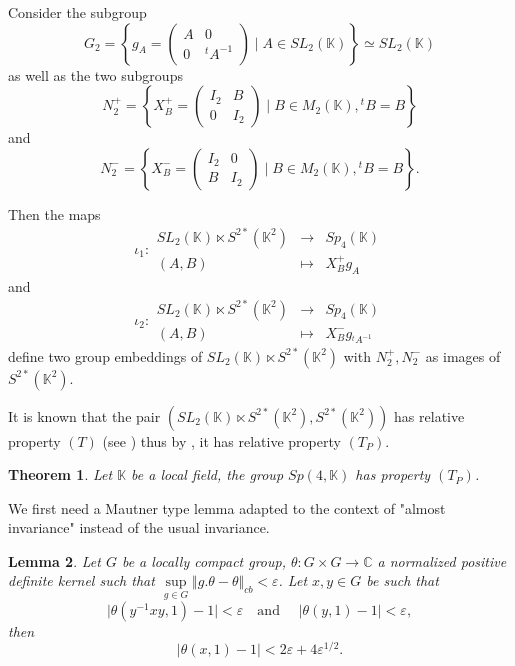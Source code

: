 \documentclass{article}
\newtheorem{theorem}{Theorem}[section]
\newtheorem{lem}[theorem]{Lemma}
\theoremstyle{definition}
\theoremstyle{remark}
\numberwithin{equation}{section}
\newcommand{\C}{\mathbb{C}}
\newcommand{\K}{\mathbb{K}}
\newcommand{\fonction}[5]{#1: \begin{array}{ccc}
#2 & \rightarrow & #3 \\
 #4 & \longmapsto & #5 \end{array}}
\begin{document}
Consider the subgroup $$G_2=\left\lbrace g_A=\begin{pmatrix}A & 0\\0& {}^tA^{-1} \end{pmatrix} \mid A\in SL_2(\K)\right\rbrace\simeq SL_2(\K)$$as well as the two subgroups$$N_2^{+}=\left\lbrace X_B^+=\begin{pmatrix}I_2 & B\\0&I_2\end{pmatrix}\mid B\in M_2(\K), {}^tB=B 
\right\rbrace$$and$$N_2^-=\left\lbrace X_B^-=\begin{pmatrix}I_2 & 0\\B&I_2 \end{pmatrix}\mid B\in M_2(\K), {}^tB=B \right\rbrace.$$

Then the maps $$\fonction{\iota_1}{SL_2(\K)\ltimes S^{2*}(\K^2)}{Sp_4(\K)}{(A,B)}{X_B^+g_A}$$and $$\fonction{\iota_2}{SL_2(\K)\ltimes S^{2*}(\K^2)}{Sp_4(\K)}{(A,B)}{X_B^-g_{{}^tA^{-1}}}$$define two group embeddings of $SL_2(\K)\ltimes S^{2*}(\K^2)$ with $N_2^{+},N_2^{-}$ as images of $S^{2*}(\K^2)$.\medskip

It is known that the pair $(SL_2(\K)\ltimes S^{2*}(\K^2),S^{2*}(\K^2))$ has relative property $(T)$ (see \cite[Coro. 1.5.2]{bekka_de_la_harpe_valette_2008}) thus by \cite[Prop. 3]{Ozawa+2011+89+104}, it has relative property $(T_P)$.\medskip

\begin{theorem}\label{thm:sp4}
Let $\K$ be a local field, the group $Sp(4,\K)$ has property $(T_P)$.  
\end{theorem}

We first need a Mautner type lemma adapted to the context of "almost invariance" instead of the usual invariance.
\begin{lem}\label{lem:mautner}Let $G$ be a locally compact group, $\theta:G\times G\to \C$ a normalized positive definite kernel such that $\underset{g\in G}{\sup}\Vert g.\theta-\theta\Vert_{cb}<\varepsilon$. Let $x,y\in G$ be such that $$\vert \theta(y^{-1}xy,1)-1\vert <\varepsilon \quad\textrm{and }\quad\vert \theta(y,1)-1\vert <\varepsilon,$$then $$\vert \theta(x,1)-1\vert <2\varepsilon+4\varepsilon^{1/2}.$$
    
\end{lem}
\end{document}
